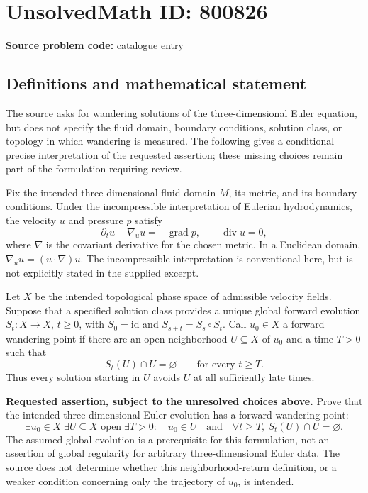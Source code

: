 \documentclass[11pt]{article}
\begin{document}
\section*{UnsolvedMath ID: 800826}
\textbf{Source problem code:} catalogue entry
\subsection{Definitions and mathematical statement}
The source asks for wandering solutions of the three-dimensional Euler equation, but does not specify the fluid domain, boundary conditions, solution class, or topology in which wandering is measured. The following gives a conditional precise interpretation of the requested assertion; these missing choices remain part of the formulation requiring review.

Fix the intended three-dimensional fluid domain \(M\), its metric, and its boundary conditions. Under the incompressible interpretation of Eulerian hydrodynamics, the velocity \(u\) and pressure \(p\) satisfy
\[
\partial_t u+\nabla_u u=-\operatorname{grad}p,
\qquad \operatorname{div}u=0,
\]
where \(\nabla\) is the covariant derivative for the chosen metric. In a Euclidean domain, \(\nabla_u u=(u\cdot\nabla)u\). The incompressible interpretation is conventional here, but is not explicitly stated in the supplied excerpt.

Let \(X\) be the intended topological phase space of admissible velocity fields. Suppose that a specified solution class provides a unique global forward evolution \(S_t:X\to X\), \(t\geq0\), with \(S_0=\mathrm{id}\) and \(S_{s+t}=S_s\circ S_t\). Call \(u_0\in X\) a forward wandering point if there are an open neighborhood \(U\subseteq X\) of \(u_0\) and a time \(T>0\) such that
\[
S_t(U)\cap U=\varnothing
\qquad\text{for every }t\geq T.
\]
Thus every solution starting in \(U\) avoids \(U\) at all sufficiently late times.

\textbf{Requested assertion, subject to the unresolved choices above.} Prove that the intended three-dimensional Euler evolution has a forward wandering point:
\[
\exists u_0\in X\;\exists U\subseteq X\text{ open}\;\exists T>0:
\quad u_0\in U\quad\text{and}\quad
\forall t\geq T,\ S_t(U)\cap U=\varnothing.
\]
The assumed global evolution is a prerequisite for this formulation, not an assertion of global regularity for arbitrary three-dimensional Euler data. The source does not determine whether this neighborhood-return definition, or a weaker condition concerning only the trajectory of \(u_0\), is intended.
\end{document}
